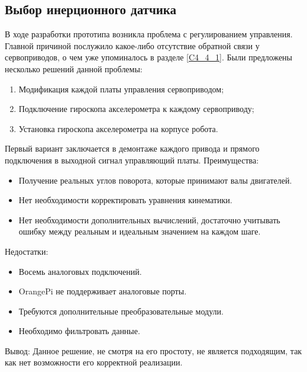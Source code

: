 \subsection{Выбор инерционного датчика}\label{C4_4_3}

В ходе разработки прототипа возникла проблема с регулированием управления. Главной причиной послужило какое-либо отсутствие обратной связи у сервоприводов, о чем уже упоминалось в разделе \ref{C4_4_1}. Были предложены несколько решений данной проблемы:
\begin{enumerate}
	\item Модификация каждой платы управления сервоприводом;
	\item Подключение гироскопа акселерометра к каждому сервоприводу;
	\item Установка гироскопа акселерометра на корпусе робота.
\end{enumerate}
Первый вариант заключается в демонтаже каждого привода и прямого подключения в выходной сигнал управляющий платы.\newline 
Преимущества:
\begin{itemize}
 	\item Получение реальных углов поворота, которые принимают валы двигателей.
 	\item Нет необходимости корректировать уравнения кинематики.
 	\item Нет необходимости дополнительных вычислений, достаточно учитывать ошибку между реальным и идеальным значением на каждом шаге.
\end{itemize}
Недостатки:
\begin{itemize}
	\item Восемь аналоговых подключений.
	\item OrangePi не поддерживает аналоговые порты.
	\item Требуются дополнительные преобразовательные модули.
	\item Необходимо фильтровать данные.
\end{itemize}
Вывод:
Данное решение, не смотря на его простоту, не является подходящим, так как нет возможности его корректной реализации.
\newline


